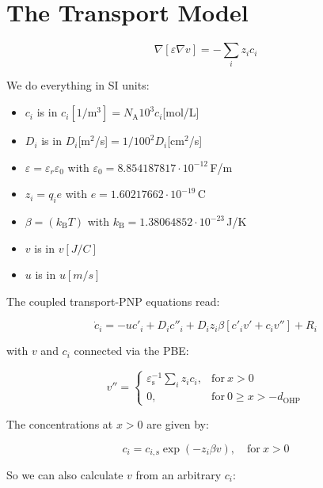 \documentclass[10pt,a4paper]{article}
\begin{document}
\section{The Transport Model}

\begin{equation}
\nabla [\varepsilon \nabla v] = - \sum_i z_i c_i
\end{equation}

We do everything in SI units:

\begin{itemize}
\item $c_i$ is in $c_i[1/\mathrm{m}^3] = N_\mathrm{A} 10^3 c_i$[mol/L]
\item $D_i$ is in $D_i$[m$^2$/s]$ = 1/100^2 D_i$[cm$^2$/s]
\item $\varepsilon = \varepsilon_r \varepsilon_0$ with $\varepsilon_0 = 8.854187817\cdot 10^{-12}$\,F/m
\item $z_i = q_i e$ with $e = 1.60217662\cdot 10^{-19}$\,C
\item $\beta = (k_\mathrm{B}T)$ with $k_\mathrm{B} = 1.38064852\cdot 10^{-23}$\,J/K
\item $v$ is in $v[J/C]$
\item $u$ is in $u[m/s]$
\end{itemize}


The coupled transport-PNP equations read:

\begin{equation}
\dot{c}_i =  -u c'_i + D_i c''_i + D_i z_i \beta \left[c'_i v' + c_i v'' \right] + R_i
\end{equation}

with $v$ and $c_i$ connected via the PBE:

\begin{equation}
v'' = \left.
\begin{cases}
\varepsilon_\mathrm{s}^{-1} \sum\limits_i z_i c_i,& \mathrm{for}~ x > 0\\
0, & \mathrm{for}~ 0 \geq x > -d_\mathrm{OHP}
\end{cases}
\right.
\end{equation}

The concentrations at $x>0$ are given by:

\begin{equation}
c_i = c_{i,\mathrm{s}} \exp\left(-z_i \beta v\right), \quad \mathrm{for}~ x > 0
\end{equation}

So we can also calculate $v$ from an arbitrary $c_i$:
\end{document}
